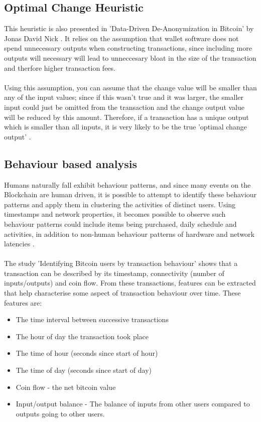 \subsection{Optimal Change Heuristic}\label{background:optimal-change-heuristic}
This heuristic is also presented in 'Data-Driven De-Anonymization in Bitcoin' by Jonas David Nick \cite{RefWorks:doc:5cfa2acee4b0132e0223d6f7}. It relies on the assumption that wallet software does not spend unnecessary outputs when constructing transactions, since including more outputs will necessary will lead to unneccesary bloat in the size of the transaction and therfore higher transaction fees.
\\\\
Using this assumption, you can assume that the change value will be smaller than any of the input values; since if this wasn't true and it was larger, the smaller input could just be omitted from the transaction and the change output value will be reduced by this amount. Therefore, if a transaction has a unique output which is smaller than all inputs, it is very likely to be the true 'optimal change output' \cite{RefWorks:doc:5cfa2acee4b0132e0223d6f7}.


\subsection{Behaviour based analysis}\label{background:behaviour-clustering}
Humans naturally fall exhibit behaviour patterns, and since many events on the Blockchain are human driven, it is possible to attempt to identify these behaviour patterns and apply them in clustering the activities of distinct users. Using timestamps and network properties, it becomes possible to observe such behaviour patterns could include items being purchased, daily schedule and activities, in addition to non-human behaviour patterns of hardware and network latencies \cite{RefWorks:doc:5c3f3459e4b042abd3bceede}. 
\\\\
The study 'Identifying Bitcoin users by transaction behaviour' \cite{RefWorks:doc:5c3f3459e4b042abd3bceede} shows that a transaction can be described by its timestamp, connectivity (number of inputs/outputs) and coin flow. From these transactions, features can be extracted that help characterise some aspect of transaction behaviour over time. These features are: 
\begin{itemize}
    \item The time interval between successive transactions
    \item The hour of day the transaction took place
    \item The time of hour (seconds since start of hour)
    \item The time of day (seconds since start of day)
    \item Coin flow - the net bitcoin value  
    \item Input/output balance - The balance of inputs from other users compared to outputs going to other users.
\end{itemize}

